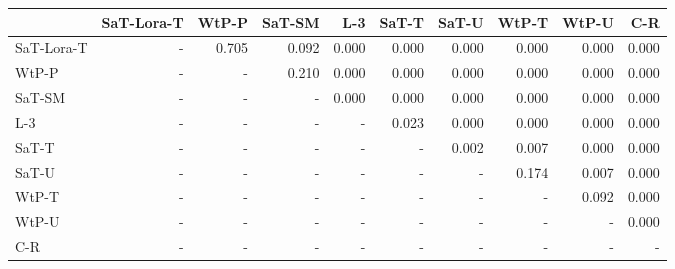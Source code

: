 \begin{tabular}{lrrrrrrrrr}
\toprule
 & SaT-Lora-T & WtP-P & SaT-SM & L-3 & SaT-T & SaT-U & WtP-T & WtP-U & C-R \\
\midrule
SaT-Lora-T & - & 0.705 & 0.092 & 0.000 & 0.000 & 0.000 & 0.000 & 0.000 & 0.000 \\
WtP-P & - & - & 0.210 & 0.000 & 0.000 & 0.000 & 0.000 & 0.000 & 0.000 \\
SaT-SM & - & - & - & 0.000 & 0.000 & 0.000 & 0.000 & 0.000 & 0.000 \\
L-3 & - & - & - & - & 0.023 & 0.000 & 0.000 & 0.000 & 0.000 \\
SaT-T & - & - & - & - & - & 0.002 & 0.007 & 0.000 & 0.000 \\
SaT-U & - & - & - & - & - & - & 0.174 & 0.007 & 0.000 \\
WtP-T & - & - & - & - & - & - & - & 0.092 & 0.000 \\
WtP-U & - & - & - & - & - & - & - & - & 0.000 \\
C-R & - & - & - & - & - & - & - & - & - \\
\bottomrule
\end{tabular}

